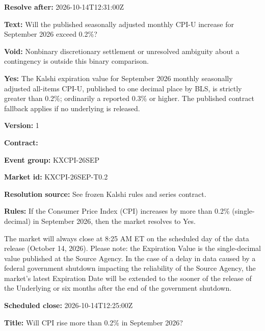 \documentclass[11pt]{article}
\begin{document}
\par\noindent\textbf{Resolve after:} 2026-10-14T12:31:00Z

\par\noindent\textbf{Text:} Will the published seasonally adjusted monthly CPI-U increase for September 2026 exceed 0.2\%?

\par\noindent\textbf{Void:} Nonbinary discretionary settlement or unresolved ambiguity about a contingency is outside this binary comparison.

\par\noindent\textbf{Yes:} The Kalshi expiration value for September 2026 monthly seasonally adjusted all-items CPI-U, published to one decimal place by BLS, is strictly greater than 0.2\%; ordinarily a reported 0.3\% or higher. The published contract fallback applies if no underlying is released.

\par\noindent\textbf{Version:} 1

\par\noindent\textbf{Contract:} \par \par\noindent\textbf{Event group:} KXCPI-26SEP

\par\noindent\textbf{Market id:} KXCPI-26SEP-T0.2

\par\noindent\textbf{Resolution source:} See frozen Kalshi rules and series contract.

\par\noindent\textbf{Rules:} If the Consumer Price Index (CPI) increases by more than 0.2\% (single-decimal) in September 2026, then the market resolves to Yes.

The market will always close at 8:25 AM ET on the scheduled day of the data release (October 14, 2026). Please note: the Expiration Value is the single-decimal value published at the Source Agency. In the case of a delay in data caused by a federal government shutdown impacting the reliability of the Source Agency, the market’s latest Expiration Date will be extended to the sooner of the release of the Underlying or six months after the end of the government shutdown.

\par\noindent\textbf{Scheduled close:} 2026-10-14T12:25:00Z

\par\noindent\textbf{Title:} Will CPI rise more than 0.2\% in September 2026?
\end{document}
